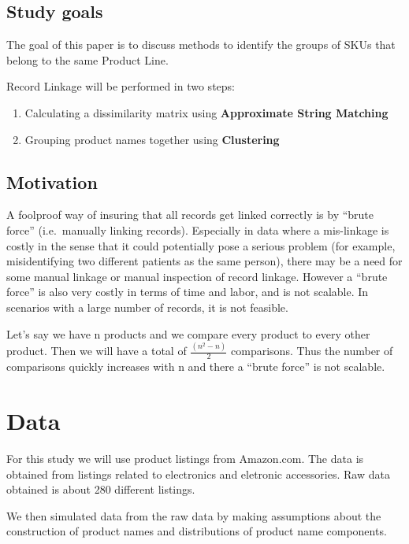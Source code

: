 \documentclass[]{article}
\begin{document}
\subsection{Study goals}\label{study-goals}

The goal of this paper is to discuss methods to identify the groups of
SKUs that belong to the same Product Line.

Record Linkage will be performed in two steps:

\begin{enumerate}
\def\labelenumi{\arabic{enumi})}
\item
  Calculating a dissimilarity matrix using
  \textbf{Approximate String Matching}
\item
  Grouping product names together using \textbf{Clustering}
\end{enumerate}

\subsection{Motivation}\label{motivation}

A foolproof way of insuring that all records get linked correctly is by
``brute force'' (i.e.~manually linking records). Especially in data
where a mis-linkage is costly in the sense that it could potentially
pose a serious problem (for example, misidentifying two different
patients as the same person), there may be a need for some manual
linkage or manual inspection of record linkage. However a ``brute
force'' is also very costly in terms of time and labor, and is not
scalable. In scenarios with a large number of records, it is not
feasible.

Let's say we have n products and we compare every product to every other
product. Then we will have a total of \(\frac{(n^2 - n)}{2}\)
comparisons. Thus the number of comparisons quickly increases with n and
there a ``brute force'' is not scalable.

\section{Data}\label{data}

For this study we will use product listings from Amazon.com. The data is
obtained from listings related to electronics and eletronic accessories.
Raw data obtained is about 280 different listings.

We then simulated data from the raw data by making assumptions about the
construction of product names and distributions of product name
components.
\end{document}
